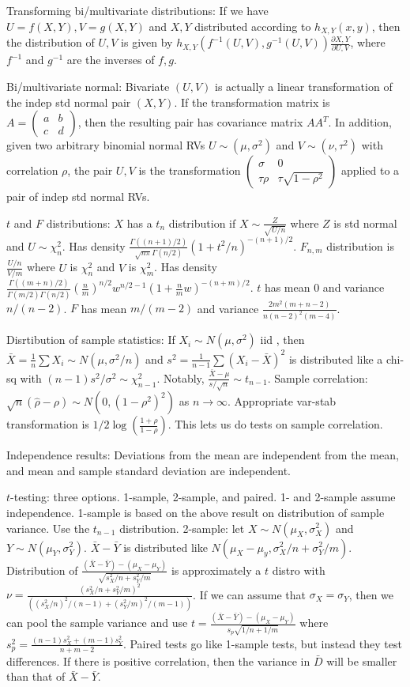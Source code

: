 \documentclass{article}
\newcommand{\openm}{\begin{pmatrix}}
\newcommand{\closem}{\end{pmatrix}}
\begin{document}
Transforming bi/multivariate distributions: If we have $U=f(X,Y),V=g(X,Y)$ and $X,Y$ distributed according to $h_{X,Y}(x,y)$, then the distribution of $U,V$ is given by $h_{X,Y}(f^{-1}(U,V),g^{-1}(U,V))\frac{\partial X,Y}{\partial U,V}$, where $f^{-1}$ and $g^{-1}$ are the inverses of $f,g$. 

Bi/multivariate normal: Bivariate $(U,V)$ is actually a linear transformation of the indep std normal pair $(X,Y)$. If the transformation matrix is $A=\openm a&b\\c&d\closem$, then the resulting pair has covariance matrix $AA^T$. In addition, given two arbitrary binomial normal RVs $U\sim(\mu,\sigma^2)$ and $V\sim(\nu,\tau^2)$ with correlation $\rho$, the pair $U,V$ is the transformation $\openm\sigma &0\\\tau\rho &\tau\sqrt{1-\rho^2}\closem$ applied to a pair of indep std normal RVs. 

$t$ and $F$ distributions: $X$ has a $t_n$ distribution if $X\sim\frac{Z}{\sqrt{U/n}}$ where $Z$ is std normal and $U\sim\chi^2_n$. Has density $\frac{\Gamma((n+1)/2)}{\sqrt{n\pi}\Gamma(n/2)}(1+t^2/n)^{-(n+1)/2}$. $F_{n,m}$ distribution is $\frac{U/n}{V/m}$ where $U$ is $\chi^2_n$ and $V$ is $\chi^2_{m}$. Has density $\frac{\Gamma((m+n)/2)}{\Gamma(m/2)\Gamma(n/2)}\left(\frac{n}{m}\right)^{n/2}w^{n/2-1}(1+\frac{n}{m}w)^{-(n+m)/2}$. $t$ has mean $0$ and variance $n/(n-2)$. $F$ has mean $m/(m-2)$ and variance $\frac{2m^2(m+n-2)}{n(n-2)^2(m-4)}$.

Disrtibution of sample statistics: If $X_i\sim N(\mu,\sigma^2)$ iid , then $\bar{X}=\frac{1}{n}\sum X_i\sim N(\mu,\sigma^2/n)$ and $s^2=\frac{1}{n-1}\sum(X_i-\bar{X})^2$ is distributed like a chi-sq with $(n-1)s^2/\sigma^2\sim\chi^2_{n-1}$. Notably, $\frac{\bar{X}-\mu}{s/\sqrt{n}}\sim t_{n-1}$. Sample correlation: $\sqrt{n}(\hat{\rho}-\rho)\sim N(0,(1-\rho^2)^2)$ as $n\to\infty$. Appropriate var-stab transformation is $1/2\log\left(\frac{1+\rho}{1-\rho}\right)$. This lets us do tests on sample correlation. 

Independence results: Deviations from the mean are independent from the mean, and mean and sample standard deviation are independent.

$t$-testing: three options. 1-sample, 2-sample, and paired. 1- and 2-sample assume independence. 1-sample is based on the above result on distribution of sample variance. Use the $t_{n-1}$ distribution. 2-sample: let $X\sim N(\mu_X,\sigma_X^2)$ and $Y\sim N(\mu_Y,\sigma_Y^2)$. $\bar{X}-\bar{Y}$ is distributed like $N(\mu_X-\mu_y,\sigma_X^2/n+\sigma_Y^2/m)$. Distribution of $\frac{(\bar{X}-\bar{Y})-(\mu_X-\mu_Y)}{\sqrt{s_X^2/n+s_Y^2/m}}$ is approximately a $t$ distro with $\nu=\frac{(s_X^2/n+s_Y^2/m)^2}{((s_X^2/n)^2/(n-1)+(s_Y^2/m)^2/(m-1))}$. If we can assume that $\sigma_X=\sigma_Y$, then we can pool the sample variance and use $t=\frac{(\bar{X}-\bar{Y})-(\mu_X-\mu_Y)}{s_p\sqrt{1/n+1/m}}$ where $s_p^2=\frac{(n-1)s_X^2+(m-1)s_Y^2}{n+m-2}$. Paired tests go like 1-sample tests, but instead they test differences. If there is positive correlation, then the variance in $\bar{D}$ will be smaller than that of $\bar{X}-\bar{Y}$.
\end{document}
